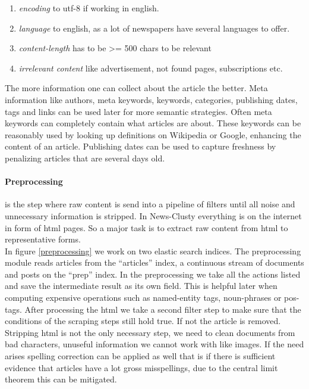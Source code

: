   \begin{enumerate}
    \item \emph{encoding} to utf-8 if working in english.
    \item \emph{language} to english, as a lot of newspapers have several languages to offer.
    \item \emph{content-length} has to be >= 500 chars to be relevant
    \item \emph{irrelevant content} like advertisement, not found pages, subscriptions etc.
  \end{enumerate}

  The more information one can collect about the article the better. Meta information like authors, meta keywords, keywords, categories, publishing dates, tags and links can be used later for more semantic strategies. Often meta keywords can completely contain what articles are about. These keywords can be reasonably used by looking up definitions on Wikipedia or Google, enhancing the content of an article. Publishing dates can be used to capture freshness by penalizing articles that are several days old.

  \paragraph{Preprocessing} is the step where raw content is send into a pipeline of filters until all noise and unnecessary information is stripped. In News-Clusty everything is on the internet in form of html pages. So a major task is to extract raw content from html to representative forms.\\
  In figure \ref{preprocessing} we work on two elastic search indices. The preprocessing module reads articles from the ``articles'' index, a continuous stream of documents and posts on the ``prep'' index. In the preprocessing we take all the actions listed and save the intermediate result as its own field. This is helpful later when computing expensive operations such as named-entity tags, noun-phrases or pos-tags. After processing the html we take a second filter step to make sure that the conditions of the scraping steps still hold true. If not the article is removed. Stripping html is not the only necessary step, we need to clean documents from bad characters, unuseful information we cannot work with like images. If the need arises spelling correction can be applied as well that is if there is sufficient evidence that articles have a lot gross misspellings, due to the central limit theorem this can be mitigated.

